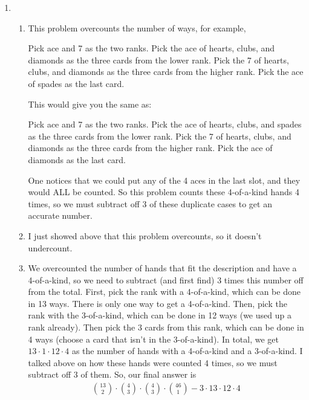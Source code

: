 \documentclass[12pt]{article}
\theoremstyle{definition}
\theoremstyle{remark}
\begin{document}
\begin{enumerate}[leftmargin=\labelsep]
		\newpage
		\item \begin{enumerate}
			\item This problem overcounts the number of ways, for example, 
			
			Pick ace and 7 as the two ranks.
			Pick the ace of hearts, clubs, and diamonds as the three cards from the lower rank.
			Pick the 7 of hearts, clubs, and diamonds as the three cards from the higher rank.
			Pick the ace of spades as the last card.
			
			This would give you the same as:
			
			Pick ace and 7 as the two ranks.
			Pick the ace of hearts, clubs, and spades as the three cards from the lower rank.
			Pick the 7 of hearts, clubs, and diamonds as the three cards from the higher rank.
			Pick the ace of diamonds as the last card.
			
			One notices that we could put any of the 4 aces in the last slot, and they would ALL be counted. So this problem counts these 4-of-a-kind hands 4 times, so we must subtract off 3 of these duplicate cases to get an accurate number.
			
			\item I just showed above that this problem overcounts, so it doesn't undercount.
			
			\item We overcounted the number of hands that fit the description and have a 4-of-a-kind, so we need to subtract (and first find) 3 times this number off from the total. First, pick the rank with a 4-of-a-kind, which can be done in 13 ways. There is only one way to get a 4-of-a-kind. Then, pick the rank with the 3-of-a-kind, which can be done in 12 ways (we used up a rank already). Then pick the 3 cards from this rank, which can be done in 4 ways (choose a card that isn't in the 3-of-a-kind). In total, we get $13 \cdot 1 \cdot 12 \cdot 4$ as the number of hands with a 4-of-a-kind and a 3-of-a-kind. I talked above on how these hands were counted 4 times, so we must subtract off 3 of them. So, our final answer is 
			\begin{align*}
				{13 \choose 2} \cdot {4 \choose 3} \cdot {4 \choose 3} \cdot {46 \choose 1} - 3 \cdot 13 \cdot 12 \cdot 4
			\end{align*}
		

\end{enumerate}
\end{enumerate}
\end{document}

